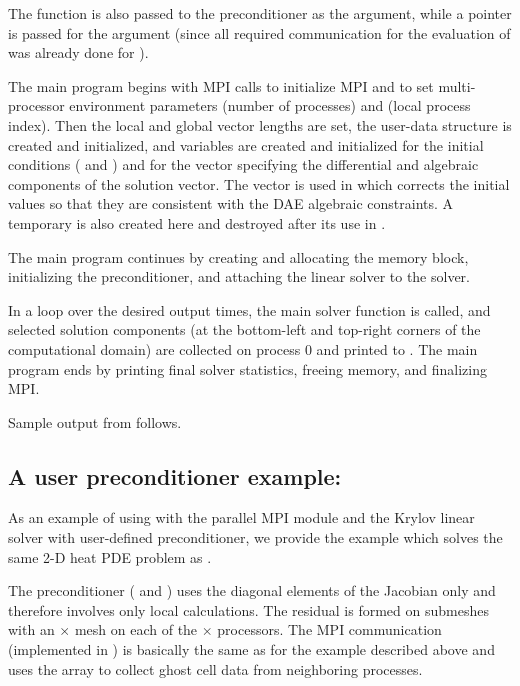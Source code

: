 The function  is also passed to the {\idabbdpre} preconditioner
as the  argument, while a  pointer is passed for the 
argument (since all required communication for the evaluation of  was
already done for ).

The main program begins with MPI calls to initialize MPI and to set
multi-processor environment parameters  (number of processes) and
 (local process index).  Then the local and global vector lengths
are set, the user-data structure  is created and initialized, and
 variables are created and initialized for the initial conditions
( and ) and for the vector  specifying the differential 
and algebraic components of the solution vector. The  vector is used
in  which corrects the initial values so that they are
consistent with the DAE algebraic constraints.
A temporary   is also created here and destroyed after
its use in .

The main program continues by creating and allocating the {\ida} memory
block, initializing the {\idabbdpre} preconditioner, and attaching the
{\idaspgmr} linear solver to the {\ida} solver.

In a loop over the desired output times, the main solver function 
is called, and selected solution components (at the bottom-left and top-right
corners of the computational domain) are collected on process 0 and printed
to . The main program ends by printing final solver statistics,
freeing memory, and finalizing MPI.

Sample output from  follows.


\subsection{A user preconditioner example: }\label{ss:iheatpk}

As an example of using {\ida} with the parallel MPI {\nvecp} module and the Krylov 
linear solver {\idaspgmr} with user-defined preconditioner, we provide the example
 which solves the same 2-D heat PDE problem as . 

The preconditioner ( and ) uses the diagonal 
elements of the Jacobian only and therefore involves only local calculations. 
The residual is formed on submeshes with an  $\times$  mesh 
on each of the  $\times$  processors. 
The MPI communication (implemented in ) is basically the same
as for the  example described above and uses the  array
to collect ghost cell data from neighboring processes.


